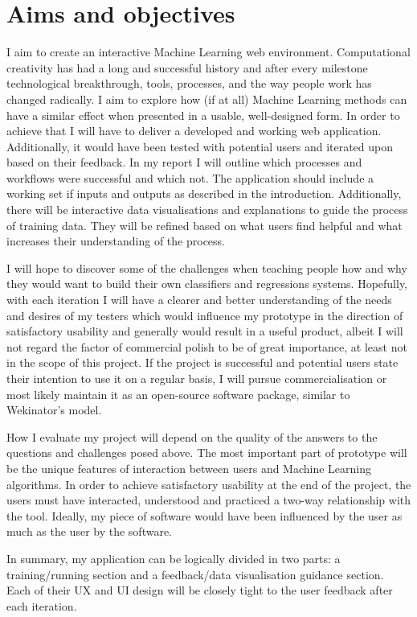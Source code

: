 \documentclass[a4paper, 11pt]{article}
\begin{document}
  \section{Aims and objectives}
  I aim to create an interactive Machine Learning web environment. Computational creativity has had a long and successful history and after every milestone technological breakthrough, tools, processes, and the way people work has changed radically. I aim to explore how (if at all) Machine Learning methods can have a similar effect when presented in a usable, well-designed form. In order to achieve that I will have to deliver a developed and working web application. Additionally, it would have been tested with potential users and iterated upon based on their feedback. In my report I will outline which processes and workflows were successful and which not. The application should include a working set if inputs and outputs as described in the introduction. Additionally, there will be interactive data visualisations and explanations to guide the process of training data. They will be refined based on what users find helpful and what increases their understanding of the process.

  I will hope to discover some of the challenges when teaching people how and why they would want to build their own classifiers and regressions systems. Hopefully, with each iteration I will have a clearer and better understanding of the needs and desires of my testers which would influence my prototype in the direction of satisfactory usability and generally would result in a useful product, albeit I will not regard the factor of commercial polish to be of great importance, at least not in the scope of this project. If the project is successful and potential users state their intention to use it on a regular basis, I will pursue commercialisation or most likely maintain it as an open-source software package, similar to Wekinator's model.

  How I evaluate my project will depend on the quality of the answers to the questions and challenges posed above. The most important part of prototype will be the unique features of interaction between users and Machine Learning algorithms. In order to achieve satisfactory usability at the end of the project, the users must have interacted, understood and practiced a two-way relationship with the tool. Ideally, my piece of software would have been influenced by the user as much as the user by the software.

  In summary, my application can be logically divided in two parts: a training/running section and a feedback/data visualisation guidance section. Each of their UX and UI design will be closely tight to the user feedback after each iteration.
\end{document}
